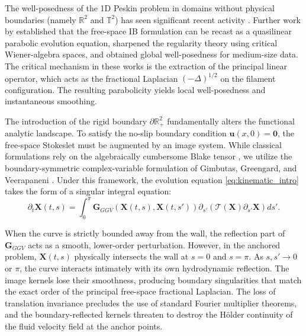 \documentclass{amsart}
\begin{document}
The well-posedness of the 1D Peskin problem in domains without physical boundaries (namely $\mathbb{R}^2$ and $\mathbb{T}^2$) has seen significant recent activity \cite{mori2019well, lin2019solvability}. Further work by  \cite{garcia2020peskin} established that the free-space IB formulation can be recast as a quasilinear parabolic evolution equation, sharpened the regularity theory using critical Wiener-algebra spaces, and obtained global well-posedness for medium-size data. The critical mechanism in these works is the extraction of the principal linear operator, which acts as the fractional Laplacian $(-\Delta)^{1/2}$ on the filament configuration. The resulting parabolicity yields local well-posedness and instantaneous smoothing.

The introduction of the rigid boundary $\partial \mathbb{R}^2_+$ fundamentally alters the functional analytic landscape. To satisfy the no-slip boundary condition $\mathbf{u}(x,0) = \mathbf{0}$, the free-space Stokeslet must be augmented by an image system. While classical formulations rely on the algebraically cumbersome Blake tensor \cite{blake1971note}, we utilize the boundary-symmetric complex-variable formulation of Gimbutas, Greengard, and Veerapaneni \cite{gimbutas2015simple}. Under this framework, the evolution equation \eqref{eq:kinematic_intro} takes the form of a singular integral equation:
\begin{equation}
    \partial_t \mathbf{X}(t,s) = \int_0^\pi \mathbf{G}_{GGV}(\mathbf{X}(t,s), \mathbf{X}(t,s')) \partial_{s'} \left( \mathcal{T}(\mathbf{X}) \partial_{s'} \mathbf{X} \right) ds'.
\end{equation}

When the curve is strictly bounded away from the wall, the reflection part of $\mathbf{G}_{GGV}$ acts as a smooth, lower-order perturbation. However, in the anchored problem, $\mathbf{X}(t,s)$ physically intersects the wall at $s=0$ and $s=\pi$. As $s, s' \to 0$ or $\pi$, the curve interacts intimately with its own hydrodynamic reflection. The image kernels lose their smoothness, producing boundary singularities that match the exact order of the principal free-space fractional Laplacian. The loss of translation invariance precludes the use of standard Fourier multiplier theorems, and the boundary-reflected kernels threaten to destroy the H\"{o}lder continuity of the fluid velocity field at the anchor points.
\end{document}
